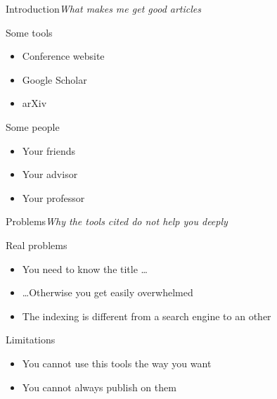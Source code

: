 


\maketitle


\begin{frame}{Introduction}{\textit{What makes me get good articles}}

\begin{block}{Some tools}
\begin{itemize}
\item Conference website
\item Google Scholar
\item arXiv
\end{itemize}
\end{block}

\begin{block}{Some people}
\begin{itemize}
\item Your friends
\item Your advisor
\item Your professor
\end{itemize}
\end{block}

\end{frame}


\begin{frame}{Problems}{\textit{Why the tools cited do not help you deeply}}

\begin{block}{Real problems}
\begin{itemize}
\item You need to know the title \ldots
\item \ldots Otherwise you get easily overwhelmed
\item The indexing is different from a search engine to an other
\end{itemize}
\end{block}

\begin{block}{Limitations}
\begin{itemize}
\item You cannot use this tools the way you want
\item You cannot always publish on them
\end{itemize}
\end{block}

\end{frame}


